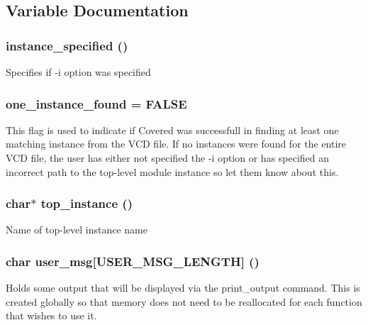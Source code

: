 \subsection{Variable Documentation}
\subsubsection{ {\bf instance\_\-specified} ()}\label{vcd_8c_a2}


Specifies if -i option was specified 
\subsubsection{ {\bf one\_\-instance\_\-found} = FALSE}\label{vcd_8c_a3}


This flag is used to indicate if Covered was successfull in finding at least one matching instance from the VCD file. If no instances were found for the entire VCD file, the user has either not specified the -i option or has specified an incorrect path to the top-level module instance so let them know about this. 
\subsubsection{\setlength{\rightskip}{0pt plus 5cm}char$\ast$ {\bf top\_\-instance} ()}\label{vcd_8c_a1}


Name of top-level instance name 
\subsubsection{\setlength{\rightskip}{0pt plus 5cm}char {\bf user\_\-msg}[USER\_\-MSG\_\-LENGTH] ()}\label{vcd_8c_a0}


Holds some output that will be displayed via the print\_\-output command. This is created globally so that memory does not need to be reallocated for each function that wishes to use it. 